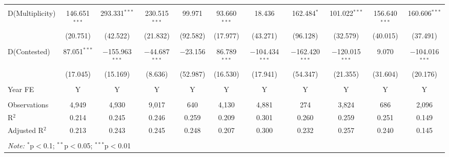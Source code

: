 \documentclass[12pt,a4paper]{article}
\begin{document}
\begin{appendices}
\begin{landscape}
\begin{table}
{\begin{tabular}{lcccccccccc}
						& & & & & & & & & & \\ 
						D(Multiplicity) & 146.651$^{***}$ & 293.331$^{***}$ & 230.515$^{***}$ & 99.971 & 93.660$^{***}$ & 18.436 & 162.484$^{*}$ & 101.022$^{***}$ & 156.640$^{***}$ & 160.606$^{***}$ \\ 
						& (20.751) & (42.522) & (21.832) & (92.582) & (17.977) & (43.271) & (96.128) & (32.579) & (40.015) & (37.491) \\ 
						& & & & & & & & & & \\ 
						D(Contested) & 87.051$^{***}$ & $-$155.963$^{***}$ & $-$44.687$^{***}$ & $-$23.156 & 86.789$^{***}$ & $-$104.434$^{***}$ & $-$162.420$^{***}$ & $-$120.015$^{***}$ & 9.070 & $-$104.016$^{***}$ \\ 
						& (17.045) & (15.169) & (8.636) & (52.987) & (16.530) & (17.941) & (54.347) & (21.355) & (31.604) & (20.176) \\
						\hline \\[-1.8ex]
						Year FE & Y & Y & Y & Y & Y & Y & Y & Y & Y & Y \\
						\hline \\[-1.8ex] 
						Observations & 4,949 & 4,930 & 9,017 & 640 & 4,130 & 4,881 & 274 & 3,824 & 686 & 2,096 \\ 
						R$^{2}$ & 0.214 & 0.245 & 0.246 & 0.259 & 0.209 & 0.301 & 0.260 & 0.259 & 0.251 & 0.149 \\ 
						Adjusted R$^{2}$ & 0.213 & 0.243 & 0.245 & 0.248 & 0.207 & 0.300 & 0.232 & 0.257 & 0.240 & 0.145 \\ 
						\hline \\[-1.8ex] 
						\multicolumn{11}{l}{\textit{Note:} $^{*}$p$<$0.1; $^{**}$p$<$0.05; $^{***}$p$<$0.01} \\ 
				\end{tabular}}
			\end{table}
		\end{landscape}
		

\end{appendices}
\end{document}

